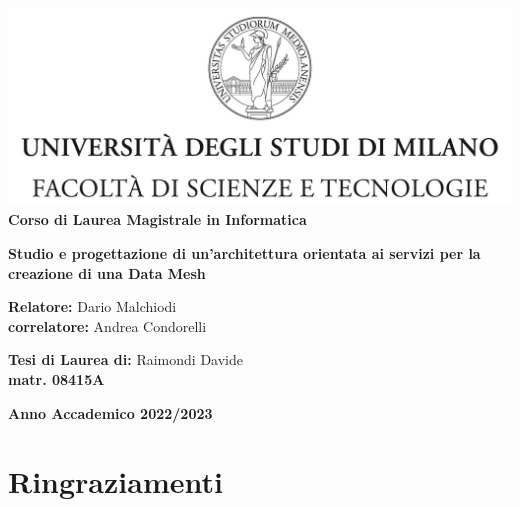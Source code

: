 \documentclass[a4paper,12pt]{report}
\begin{document}
\begin{titlepage}
    \begin{center}
    \includegraphics[width=\textwidth]{immagini/tesiSCIENZE_TECNOLOGIE.jpg}\\
    {\large{\bf Corso di Laurea Magistrale in Informatica}}
    \end{center}
    \vspace{12mm}
    \begin{center}
    \vspace{4mm}
    {\huge{\bf Studio e progettazione di un'architettura orientata ai servizi per la creazione di una Data Mesh}}\\
    \end{center}
    \vspace{4mm}
    \begin{flushleft}
    {\large{\bf Relatore:}}
    {\large{Dario Malchiodi}}\\
    \vspace{4mm}
    {\large{\bf correlatore:}}
    {\large{Andrea Condorelli}}\\
    \end{flushleft}
    \vspace{12mm}
    \begin{flushright}
    {\large{\bf Tesi di Laurea di:}}
    {\large{Raimondi Davide}}\\
    {\large{\bf matr. 08415A}}\\
    \end{flushright}
    \vspace{4mm}
    \begin{center}
    {\large{\bf Anno Accademico 2022/2023}}
    \end{center}
    \end{titlepage}
    
\onehalfspacing
\tableofcontents{}
\chapter*{Ringraziamenti}
\end{document}
